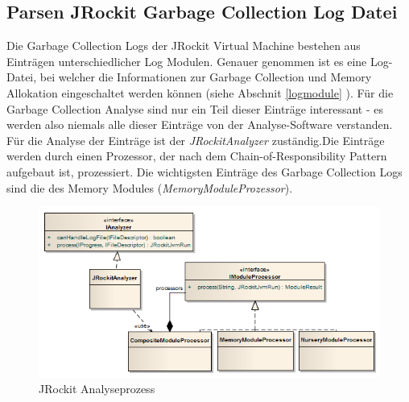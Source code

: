 \subsection{Parsen JRockit Garbage Collection Log Datei}
Die Garbage Collection Logs der JRockit Virtual Machine bestehen aus Einträgen unterschiedlicher Log Modulen. Genauer genommen ist es eine Log-Datei, bei welcher die Informationen zur Garbage Collection und Memory Allokation eingeschaltet werden können (siehe Abschnit \ref{logmodule} ). Für die Garbage Collection Analyse sind nur ein Teil dieser Einträge interessant - es werden also niemals alle dieser Einträge von der Analyse-Software verstanden. Für die Analyse der Einträge ist der \textit{JRockitAnalyzer} zuständig.Die Einträge werden durch einen Prozessor, der nach dem Chain-of-Responsibility Pattern\cite{wiki:chainOfResponsibilityPattern} aufgebaut ist, prozessiert. Die wichtigsten Einträge des Garbage Collection Logs sind die des Memory Modules (\textit{MemoryModuleProzessor}). 




 \begin{figure}[H]
  	\centering
        	\caption{JRockit Analyseprozess}
    	\includegraphics[width=16cm]{images/jrockit_log_processing}
\end{figure}

